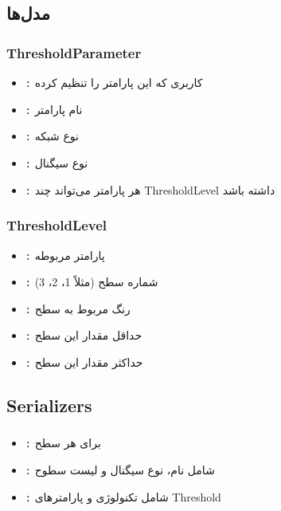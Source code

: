 \documentclass{report}
\begin{document}
\subsection{مدل‌ها}
\subsubsection{ThresholdParameter}
\begin{itemize}
    \item \texttt{:} کاربری که این پارامتر را تنظیم کرده
    \item \texttt{:} نام پارامتر 
    \item \texttt{:} نوع شبکه 
    \item \texttt{:} نوع سیگنال 
    \item \texttt{:} هر پارامتر می‌تواند چند ThresholdLevel داشته باشد
\end{itemize}

\subsubsection{ThresholdLevel}
\begin{itemize}
    \item \texttt{:} پارامتر مربوطه
    \item \texttt{:} شماره سطح (مثلاً 1، 2، 3)
    \item \texttt{:} رنگ مربوط به سطح 
    \item \texttt{:} حداقل مقدار این سطح
    \item \texttt{:} حداکثر مقدار این سطح
\end{itemize}

\subsection{Serializers}

\subsubsection{}
\begin{itemize}
    \item \texttt{:} برای هر سطح
    \item \texttt{:} شامل نام، نوع سیگنال و لیست سطوح
    \item \texttt{:} شامل تکنولوژی و پارامترهای Threshold
\end{itemize}
\end{document}
